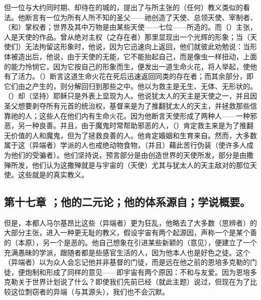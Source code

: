 但一位与大约同时期、却待在的城的，提出了与所主张的（任何）教义类似的看法。他断言有一位为所有人所不知的圣父——祂创造了天使、总领天使、宰制者、（和）掌权者；世界及其中万物是由某些天使——七位——所造的。而（）主张，人是天使的作品。曾从绝对主权（之存在者）那里显现出一个光辉的形象；当（天使们）无法拘留这形象时，他说，因为它迅速向上返回，他们就彼此劝勉说：当形体被造出后，他说，由于天使的无能，它不能抬起自己，而是像虫一样扭动，上面的能力怜悯它，因为它按自己的形象而生，便发出一道生命火花，将人举起，使他有了活力。（）断言这道生命火花在死后迅速返回同类的存在者；而其余部分，即它们由之产生的，则分解回归到那些之中。他以为救主是无生、无体、无形状的。（）却（坚持）耶稣只是外表上显现为人。他说犹太人的天主是天使之一，并且因圣父想要剥夺所有元首的统治权，基督来是为了推翻犹太人的天主，并拯救那些信靠祂的人；这些人在他们内有生命火花。因为他断言天使形成了两种人——一种邪恶，另一种良善。并且，由于魔鬼时常帮助邪恶的人，（）肯定救主来是为了推翻无价值的人和魔鬼，但为了拯救良善的人。他肯定婚姻和生育来自。然而，大多数属于这（异端者）学派的人也戒绝动物食物，（并且）藉此苦行伪装（使许多人成为他们的受骗者）。他们坚持说，预言部分是由创造世界的天使所发，部分是由撒殚所发，他们认为这撒殚就是与宇宙的（天使）尤其与犹太人的天主敌对的那位天使。这些就是的真实教义。\par


\subsection{第十七章 ；他的二元论；他的体系源自；学说概要。}

但是，本都人马尔基昂比这些（异端者）更为狂乱，他略去了大多数（思辨者）的大部分主张，进入一种更无耻的教义，假设宇宙有两个起源因，声称一个是某个善的（本原），另一个是恶的。他自己想象在引进某些新颖的（意见），便建立了一个充满愚昧的学派，跟随者都是些感官生活的人，因为他本人也是好色之徒。这个（异端者）以为众人会忘记他并非基督的门徒，而是远在他之前的恩培多克勒的门徒，便炮制和形成了同样的意见——即宇宙有两个原因：不和与友爱。因为恩培多克勒关于世界计划说了什么？即使我们先前已经（就此主题）说过，但现在为了比较这位剽窃者的异端（与其源头），我们也不会沉默。\par

